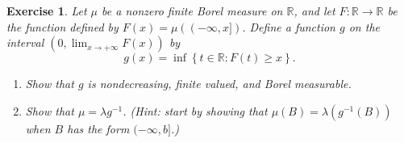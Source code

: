 \documentclass[11pt,a4paper,twoside]{article}
\newcounter{excounter}
\newtheorem{exercise}[excounter]{Exercise}
\begin{document}
\begin{exercise}
Let $\mu$ be a nonzero finite Borel measure on $\mathbb{R}$, and let
$F:\mathbb{R}\to\mathbb{R}$ be the function defined by
$F(x)=\mu\left(\left(-\infty,x\right.]\right)$. Define a function $g$ on the interval
$\left(0,\lim_{x\to+\infty}F\left(x\right)\right)$ by
  \begin{equation*}
    g(x)=\inf\left\{t\in\mathbb{R}:F\left(t\right)\geq x\right\}.
  \end{equation*}
  \begin{enumerate}
  \item Show that $g$ is nondecreasing, finite valued, and Borel
    measurable.
  \item Show that $\mu=\lambda g^{-1}$. (Hint: start by showing that
    $\mu(B)=\lambda\left(g^{-1}\left(B\right)\right)$ when $B$ has the form $(-\infty,b]$.)
  \end{enumerate}
\end{exercise}
\end{document}
